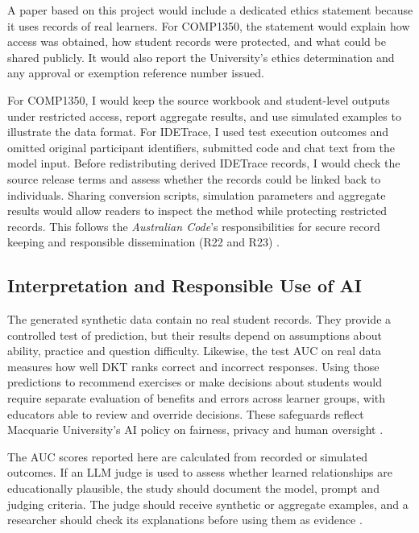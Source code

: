 \documentclass[11pt]{article}
\begin{document}
A paper based on this project would include a dedicated ethics
statement because it uses records of real learners. For COMP1350,
the statement would explain how access was obtained, how student
records were protected, and what could be shared publicly. It would
also report the University's ethics determination and any approval
or exemption reference number issued.

For COMP1350, I would keep the source workbook and student-level
outputs under restricted access, report aggregate results, and use
simulated examples to illustrate the data format. For IDETrace,
I used test execution outcomes and omitted original participant
identifiers, submitted code and chat text from the model input.
Before redistributing derived IDETrace records, I would check the
source release terms and assess whether the records could be linked
back to individuals. Sharing conversion scripts, simulation parameters
and aggregate results would allow readers to inspect the method
while protecting restricted records. This follows the
\textit{Australian Code}'s responsibilities for secure record keeping
and responsible dissemination (R22 and R23)
\citep{nhmrc2018researchcode}.

\subsection{Interpretation and Responsible Use of AI}

The generated synthetic data contain no real student records.
They provide a controlled test of prediction, but their results depend
on assumptions about ability, practice and question difficulty.
Likewise, the test AUC on real data measures how well DKT ranks
correct and incorrect responses. Using those predictions to recommend
exercises or make decisions about students would require separate
evaluation of benefits and errors across learner groups, with
educators able to review and override decisions. These safeguards
reflect Macquarie University's AI policy on fairness, privacy and
human oversight \citep{mq2025aipolicy}.

The AUC scores reported here are calculated from recorded or
simulated outcomes. If an LLM judge is used to assess whether
learned relationships are educationally plausible, the study should
document the model, prompt and judging criteria. The judge should
receive synthetic or aggregate examples, and a researcher should
check its explanations before using them as evidence
\citep{mq2025aipolicy}.
%
\end{document}
